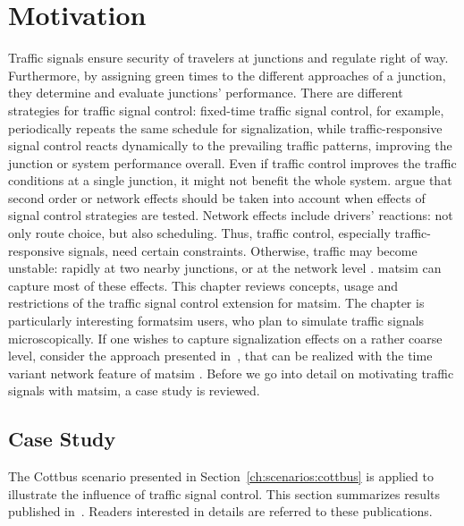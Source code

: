 \section{Motivation}
Traffic signals ensure security of travelers at junctions and regulate right of way. 
Furthermore, by assigning green times to the different approaches of a junction, they determine and evaluate junctions' performance. 
There are different strategies for traffic signal control: fixed-time traffic signal control, for example, periodically repeats the same schedule for signalization, while traffic-responsive signal control reacts dynamically to the prevailing traffic patterns, improving the junction or system performance overall.   
Even if traffic control improves the traffic conditions at a single junction, it might not benefit the whole system. 
\citet{Hu1997D2DFlowEvolutionReactiveSignalsDynasmart} argue that second order or network effects should be taken into account when effects of signal control strategies are tested. Network effects include drivers' reactions: not only route choice, but also scheduling. 
Thus, traffic control, especially traffic-responsive signals, need certain constraints. Otherwise, traffic may become unstable: rapidly at two nearby junctions, or at the network level \citep{LaemmerHelbing2010SelfStabilizingSignalControlRealNet}. \gls{matsim} can capture most of these effects. This chapter reviews concepts, usage and restrictions of the traffic signal control extension for \gls{matsim}. 
The chapter is particularly interesting for\gls{matsim} users, who plan to simulate traffic signals microscopically. 
If one wishes to capture signalization effects on a rather coarse level, consider the approach presented in~\citet[pp.~139][]{Charypar2008PhD}, that can be realized with the time variant network feature of \gls{matsim} \citep{00LaemmelGretherNagel2009TimeDependentNetworks}. 
Before we go into detail on motivating traffic signals with \gls{matsim}, a case study is reviewed. 

\subsection{Case Study}
The Cottbus scenario presented in Section~\ref{ch:scenarios:cottbus} is applied to illustrate the influence of traffic signal control. 
This section summarizes results published in~\citet{GretherBischoffNagel2011CottbusSylviaEventAbstract,Grether2014PhD}. Readers interested in details are referred to these publications. 

